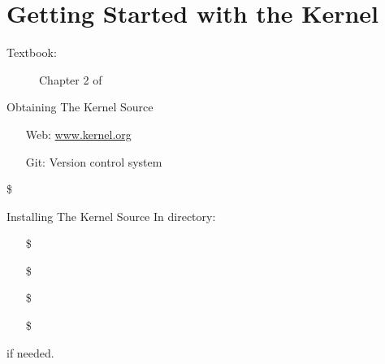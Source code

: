 \section{Getting Started with the Kernel}
\label{sec:getting-started-with}

\begin{description}
\item[Textbook:] Chapter 2 of \cite{love2010linux}
\end{description}

\begin{frame}{Obtaining The Kernel Source}
  \begin{itemize}
  \item[Web:] \href{http://www.kernel.org}{www.kernel.org}
  \item[Git:] Version control system
  \end{itemize}
  \scriptsize{\mbox{\$ }}
\end{frame}

\begin{frame}{Installing The Kernel Source}
  In  directory:
  \begin{itemize}
  \item[\$] 
  \item[\$] 
  \item[\$] 
  \item[\$] 
  \end{itemize}
   if needed.
\end{frame}

